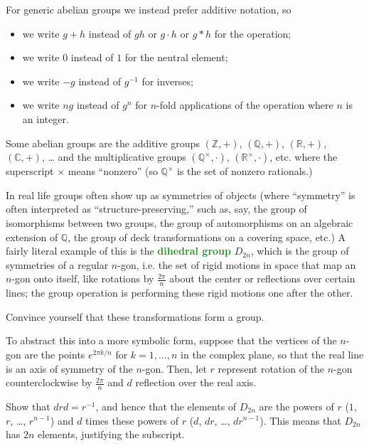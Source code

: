 \documentclass[11pt]{scrartcl}
\providecommand{\CC}{\mathbb C}
\providecommand{\QQ}{\mathbb Q}
\providecommand{\RR}{\mathbb R}
\providecommand{\ZZ}{\mathbb Z}
\providecommand{\ii}{\item}
\providecommand{\inv}{^{-1}}
\providecommand{\vocab}[1]{{\textbf{\textcolor{ForestGreen}{#1}}}}
\begin{document}
For generic abelian groups we instead prefer additive notation, so
\begin{itemize}
    \ii we write $g+h$ instead of $gh$ or $g\cdot h$ or $g*h$ for the operation;
    \ii we write $0$ instead of $1$ for the neutral element;
    \ii we write $-g$ instead of $g\inv$ for inverses;
    \ii we write $ng$ instead of $g^n$ for $n$-fold applications of the operation
    where $n$ is an integer.
\end{itemize}

\begin{example}
    Some abelian groups are the additive groups
    $(\ZZ,+)$, $(\QQ,+)$, $(\RR,+)$, $(\CC,+)$, \dots
    and the multiplicative groups
    $(\QQ^\times, \cdot)$, $(\RR^\times,\cdot)$, etc.
    where the superscript $\times$ means ``nonzero''
    (so $\QQ^\times$ is the set of nonzero rationals.)
\end{example}

In real life groups often show up as symmetries of objects
(where ``symmetry'' is often interpreted as ``structure-preserving,''
such as, say, the group of isomorphisms between two groups,
the group of automorphisms on an algebraic extension of $\QQ$,
the group of deck transformations on a covering space, etc.)
A fairly literal example of this is the \vocab{dihedral group} $D_{2n}$,
which is the group of symmetries of a regular $n$-gon, i.e.
the set of rigid motions in space that map an $n$-gon onto itself,
like rotations by $\frac{2\pi}n$ about the center
or reflections over certain lines; the group operation
is performing these rigid motions one after the other.

\begin{exercise}
    Convince yourself that these transformations form a group.
\end{exercise}

To abstract this into a more symbolic form,
suppose that the vertices of the $n$-gon are the points $e^{2\pi k/n}$
for $k = 1,\dots,n$ in the complex plane, so that the real line
is an axis of symmetry of the $n$-gon. Then, let $r$ represent
rotation of the $n$-gon counterclockwise by $\frac{2\pi}n$
and $d$ reflection over the real axis.
\begin{exercise}
    Show that $drd = r\inv$, and hence that the elements of $D_{2n}$ are
    the powers of $r$ ($1$, $r$, \dots, $r^{n-1}$)
    and $d$ times these powers of $r$ ($d$, $dr$, \dots, $dr^{n-1}$).
    This means that $D_{2n}$ has $2n$ elements, justifying the subscript.
\end{exercise}
\end{document}

